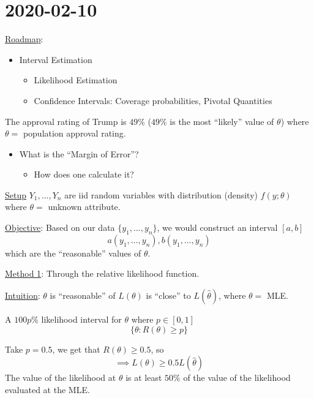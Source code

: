 \section{2020-02-10}
\underline{Roadmap}:
\begin{itemize}
    \item Interval Estimation
          \begin{itemize}
              \item Likelihood Estimation
              \item Confidence Intervals: Coverage probabilities, Pivotal Quantities
          \end{itemize}
\end{itemize}

\begin{Example}{}{}
    The approval rating of Trump is $ 49\% $ ($ 49\% $ is the most ``likely'' value of $ \theta $)
    where $ \theta= $ population approval rating.
    \begin{itemize}
        \item What is the ``Margin of Error''?
              \begin{itemize}
                  \item How does one calculate it?
              \end{itemize}
    \end{itemize}
\end{Example}

\underline{Setup} $ Y_1,\ldots ,Y_n $ are iid random variables with
distribution (density) $ f(y;\theta) $ where $ \theta= $ unknown attribute.

\underline{Objective}: Based on our data $ \{y_1,\ldots ,y_n\} $, we would
construct an interval $ [a,b] $
\[ a(y_1,\ldots ,y_n),b(y_1,\ldots ,y_n) \]
which are the ``reasonable'' values of $ \theta $.

\underline{Method 1}: Through the relative likelihood function.

\underline{Intuition}: $ \theta $ is ``reasonable'' of $ L(\theta) $
is ``close'' to $ L(\hat{\theta}) $, where $ \theta= $ MLE\@.


\begin{Definition}{}{}
    A $ 100p\% $ likelihood interval for $ \theta $ where $ p\in[0,1] $
    \[ \{\theta:R(\theta)\geqslant p\} \]
\end{Definition}

Take $ p=0.5 $, we get that $ R(\theta)\geqslant 0.5 $, so
\[ \implies L(\theta)\geqslant 0.5 L(\hat{\theta}) \]
The value of the likelihood at $ \theta $ is at least $ 50\% $ of the value of the
likelihood evaluated at the MLE\@.

